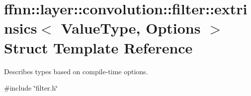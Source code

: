 \hypertarget{structffnn_1_1layer_1_1convolution_1_1filter_1_1extrinsics}{\section{ffnn\-:\-:layer\-:\-:convolution\-:\-:filter\-:\-:extrinsics$<$ Value\-Type, Options $>$ Struct Template Reference}
\label{structffnn_1_1layer_1_1convolution_1_1filter_1_1extrinsics}
}


Describes types based on compile-\/time options.  




{\ttfamily \#include \char`\"{}filter.\-h\char`\"{}}

